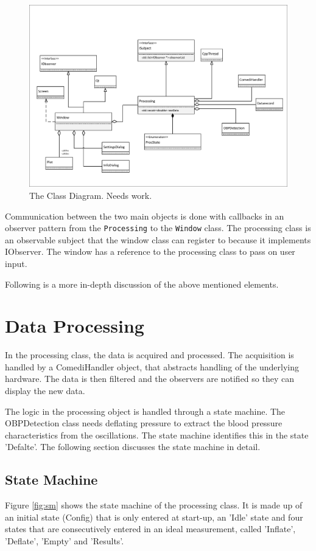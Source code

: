 \begin{figure}[ht]
\centering
\includegraphics[width=\textwidth]{figures/cd2.pdf}
\caption{The Class Diagram. Needs work.}
\label{fig:CD}
\end{figure}

Communication between the  two main objects is done with callbacks in an observer pattern from the \texttt{Processing} to the \texttt{Window} class. The processing class is an observable subject that the window class can register to because it implements IObserver. The window has a reference to the processing class to pass on user input.

Following is a more in-depth discussion of the above mentioned elements.

\section{Data Processing}
In the processing class, the data is acquired and processed. The acquisition is handled by a ComediHandler object, that abstracts handling of the underlying hardware. The data is then filtered and the observers are notified so they can display the new data. 

The logic in the processing object is handled through a state machine. The OBPDetection class needs deflating pressure to extract the blood pressure characteristics from the oscillations. The state machine identifies this in the state 'Defalte'. The following section discusses the state machine in detail.

\subsection{State Machine}
Figure \ref{fig:sm} shows the state machine of the processing class. It is made up of an initial state (Config) that is only entered at start-up, an 'Idle' state and four states that are consecutively entered in an ideal measurement, called 'Inflate', 'Deflate', 'Empty' and 'Results'.

